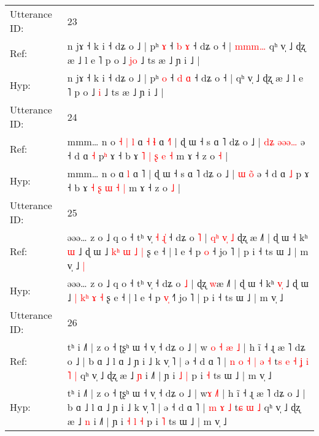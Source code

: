 \documentclass[10pt]{article}
\DeclareRobustCommand{\hl}[1]{{\textcolor{red}{#1}}}
\begin{document}
\begin{longtable}{ll}
\midrule
Utterance ID: & 23 \\
Ref: & n jɤ ˧ k i ˧ dʑ o ˩ | pʰ \hl{ɤ} ˧ \hl{b} \hl{ɤ} ˧ dʑ o ˧ |\hl{ }\hl{m}\hl{m}\hl{m}\hl{…} qʰ v̩ ˩ ɖʐ æ ˩ l e ˥ p o ˩ \hl{j}\hl{o} ˩ ts æ ˩ ɲ i ˩ |
 \\
Hyp: & n jɤ ˧ k i ˧ dʑ o ˩ | pʰ \hl{o} ˧ \hl{d} \hl{ɑ} ˧ dʑ o ˧ |\hl{}\hl{}\hl{}\hl{}\hl{} qʰ v̩ ˩ ɖʐ æ ˩ l e ˥ p o ˩ \hl{}\hl{i} ˩ ts æ ˩ ɲ i ˩ |
 \\
\midrule
Utterance ID: & 24 \\
Ref: & mmm… n o\hl{ }\hl{˧}\hl{ }\hl{|}\hl{ }\hl{l} ɑ\hl{ }\hl{˧} \hl{ɬ} ɑ \hl{˧}˥ | ɖ ɯ ˧ s ɑ ˥ dʑ o ˩ | \hl{d}\hl{ʑ} \hl{ə}\hl{ə}\hl{ə}\hl{…} ə ˧ d ɑ \hl{˧} p\hl{ʰ} ɤ ˧ b ɤ \hl{˥} \hl{|} \hl{ʂ} \hl{e} \hl{˧} m ɤ ˧ z o \hl{˧} |
 \\
Hyp: & mmm… n o\hl{}\hl{}\hl{}\hl{}\hl{}\hl{} ɑ\hl{}\hl{} \hl{l} ɑ \hl{}˥ | ɖ ɯ ˧ s ɑ ˥ dʑ o ˩ | \hl{}\hl{ɯ} \hl{}\hl{}\hl{o}\hl{̃} ə ˧ d ɑ \hl{˩} p\hl{} ɤ ˧ b ɤ \hl{˧} \hl{ʂ} \hl{ɯ} \hl{˧} \hl{|} m ɤ ˧ z o \hl{˩} |
 \\
\midrule
Utterance ID: & 25 \\
Ref: & əəə… z o ˩ q o ˧ tʰ v̩\hl{ }\hl{˧}\hl{ }\hl{ɻ}\hl{̍} ˧ dʑ o \hl{˥} |\hl{ }\hl{q}\hl{ʰ}\hl{ }\hl{v}\hl{̩}\hl{ }\hl{˩} ɖʐ \hl{}æ ˩˥ | ɖ ɯ ˧ kʰ \hl{}\hl{ɯ} ˩ ɖ ɯ ˩ \hl{k}\hl{ʰ}\hl{ }\hl{ɯ} \hl{˩} \hl{|} ʂ e ˧ | l e ˧ p \hl{}\hl{o} ˧\hl{} jo ˥ | p i ˧ ts ɯ ˩ | m v̩ ˩\hl{ }\hl{|}
 \\
Hyp: & əəə… z o ˩ q o ˧ tʰ v̩\hl{}\hl{}\hl{}\hl{}\hl{} ˧ dʑ o \hl{˩} |\hl{}\hl{}\hl{}\hl{}\hl{}\hl{}\hl{}\hl{} ɖʐ \hl{w}æ ˩˥ | ɖ ɯ ˧ kʰ \hl{v}\hl{̩} ˩ ɖ ɯ ˩ \hl{|}\hl{ }\hl{k}\hl{ʰ} \hl{ɤ} \hl{˧} ʂ e ˧ | l e ˧ p \hl{v}\hl{̩} ˧\hl{˥} jo ˥ | p i ˧ ts ɯ ˩ | m v̩ ˩\hl{}\hl{}
 \\
\midrule
Utterance ID: & 26 \\
Ref: & tʰ i ˩˥ | z o ˧ ʈʂʰ ɯ ˧ v̩ ˧ dʑ o ˩ | w\hl{ }\hl{o}\hl{ }\hl{˧} \hl{æ}\hl{ }\hl{˩} | h ĩ ˧ ɻ æ ˥ dʑ o ˩ | b ɑ ˩ l ɑ ˩ ɲ i ˩ k v̩ ˥ | ə ˧ d ɑ ˥ |\hl{ }\hl{n}\hl{ }\hl{o}\hl{ }\hl{˧} \hl{|} \hl{ə} \hl{˧} t\hl{s}\hl{ }\hl{e}\hl{ }\hl{˧}\hl{ }\hl{ʝ}\hl{ }\hl{i} \hl{˥} \hl{|} qʰ v̩ ˩ ɖʐ æ ˩ \hl{ɲ} i ˩˥ | ɲ i\hl{}\hl{} \hl{˩} \hl{|} p i \hl{˧} ts ɯ ˩ | m v̩ ˩
 \\
Hyp: & tʰ i ˩˥ | z o ˧ ʈʂʰ ɯ ˧ v̩ ˧ dʑ o ˩ | w\hl{}\hl{}\hl{}\hl{ɤ} \hl{}\hl{˩}\hl{˥} | h ĩ ˧ ɻ æ ˥ dʑ o ˩ | b ɑ ˩ l ɑ ˩ ɲ i ˩ k v̩ ˥ | ə ˧ d ɑ ˥ |\hl{}\hl{}\hl{}\hl{}\hl{}\hl{} \hl{m} \hl{ɤ} \hl{˩} t\hl{}\hl{}\hl{}\hl{}\hl{}\hl{}\hl{}\hl{}\hl{ɕ} \hl{ɯ} \hl{˩} qʰ v̩ ˩ ɖʐ æ ˩ \hl{n} i ˩˥ | ɲ i\hl{ }\hl{˧} \hl{l} \hl{˧} p i \hl{˥} ts ɯ ˩ | m v̩ ˩

\end{longtable}
\end{document}
